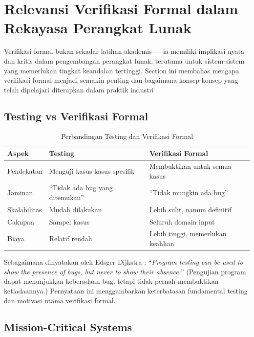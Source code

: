 \section{Relevansi Verifikasi Formal dalam Rekayasa Perangkat Lunak}

Verifikasi formal bukan sekadar latihan akademis --- ia memiliki implikasi nyata dan kritis dalam pengembangan perangkat lunak, terutama untuk sistem-sistem yang memerlukan tingkat keandalan tertinggi. Section ini membahas mengapa verifikasi formal menjadi semakin penting dan bagaimana konsep-konsep yang telah dipelajari diterapkan dalam praktik industri \cite{rosen2019}.

\subsection{Testing vs Verifikasi Formal}

\begin{table}[htbp]
\centering
\renewcommand{\arraystretch}{1.3}
\begin{tabular}{|>{\raggedright\arraybackslash}p{4cm}|>{\raggedright\arraybackslash}p{4cm}|>{\raggedright\arraybackslash}p{4.5cm}|}
\hline
\textbf{Aspek} & \textbf{Testing} & \textbf{Verifikasi Formal} \\ \hline
Pendekatan & Menguji kasus-kasus spesifik & Membuktikan untuk semua kasus \\ \hline
Jaminan & ``Tidak ada bug yang ditemukan'' & ``Tidak mungkin ada bug'' \\ \hline
Skalabilitas & Mudah dilakukan & Lebih sulit, namun definitif \\ \hline
Cakupan & Sampel kasus & Seluruh domain input \\ \hline
Biaya & Relatif rendah & Lebih tinggi, memerlukan keahlian \\ \hline
\end{tabular}
\caption{Perbandingan Testing dan Verifikasi Formal}
\end{table}

Sebagaimana dinyatakan oleh Edsger Dijkstra \cite{dijkstra1970}: ``\textit{Program testing can be used to show the presence of bugs, but never to show their absence.}'' (Pengujian program dapat menunjukkan keberadaan bug, tetapi tidak pernah membuktikan ketiadaannya.) Pernyataan ini menggambarkan keterbatasan fundamental testing dan motivasi utama verifikasi formal.

\subsection{Mission-Critical Systems}

